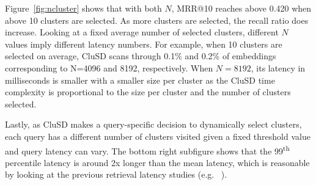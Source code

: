 Figure~\ref{fig:ncluster} shows that with both $N$,
MRR@10 reaches above 0.420 when above 10 clusters 
are selected.
As more clusters are selected,  the recall ratio does  increase. 
Looking at  a fixed average number of selected clusters, 
different $N$ values imply different latency numbers.
For example, when 10 clusters are selected on average, 
CluSD  scans through 0.1\% and  0.2\% of embeddings corresponding to N=4096 and 8192, respectively. 
When $N= 8192$, its latency in milliseconds is smaller  with a  smaller size per cluster
as the CluSD time complexity is proportional  to  the size per cluster and the number of clusters selected.

Lastly, as CluSD makes a query-specific decision to dynamically select  clusters, each query has  a  different number of clusters visited
given a fixed threshold value and query latency can vary. 
The bottom right subfigure shows that the 99\textsuperscript{th}
percentile latency is around 2x longer than the mean latency, which is reasonable by
looking at the previous retrieval latency studies (e.g. ~\cite{mallia2019pisa, mackenzie2021anytime}). 




